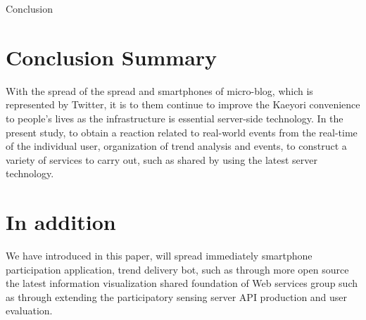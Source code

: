 \chapterhead
{Conclusion}

\section{Conclusion Summary}
With the spread of the spread and smartphones of micro-blog, which is represented by Twitter, it is to them continue to improve the Kaeyori convenience to people's lives as the infrastructure is essential server-side technology. In the present study, to obtain a reaction related to real-world events from the real-time of the individual user, organization of trend analysis and events, to construct a variety of services to carry out, such as shared by using the latest server technology.

\section{In addition}
We have introduced in this paper, will spread immediately smartphone participation application, trend delivery bot, such as through more open source the latest information visualization shared foundation of Web services group such as through extending the participatory sensing server API production and user evaluation.
